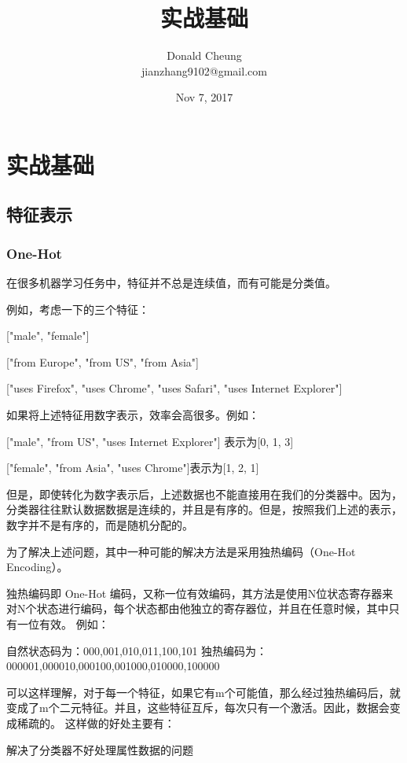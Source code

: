 \documentclass[10pt,a4paper]{ctexbook}
\begin{document}
    \setlength{\baselineskip}{20pt}
    \title{实战基础}
    \author{Donald Cheung\\jianzhang9102@gmail.com}
    \date{Nov 7, 2017}
    \tableofcontents
\fi

\chapter{实战基础}
\section{特征表示}

\subsection{One-Hot}
在很多机器学习任务中，特征并不总是连续值，而有可能是分类值。

例如，考虑一下的三个特征：

["male", "female"]

["from Europe", "from US", "from Asia"]

["uses Firefox", "uses Chrome", "uses Safari", "uses Internet Explorer"]

如果将上述特征用数字表示，效率会高很多。例如：

["male", "from US", "uses Internet Explorer"] 表示为[0, 1, 3]

["female", "from Asia", "uses Chrome"]表示为[1, 2, 1]

但是，即使转化为数字表示后，上述数据也不能直接用在我们的分类器中。因为，分类器往往默认数据数据是连续的，并且是有序的。但是，按照我们上述的表示，数字并不是有序的，而是随机分配的。

为了解决上述问题，其中一种可能的解决方法是采用独热编码（One-Hot Encoding）。

独热编码即 One-Hot 编码，又称一位有效编码，其方法是使用N位状态寄存器来对N个状态进行编码，每个状态都由他独立的寄存器位，并且在任意时候，其中只有一位有效。
例如：

自然状态码为：000,001,010,011,100,101
独热编码为：000001,000010,000100,001000,010000,100000

可以这样理解，对于每一个特征，如果它有m个可能值，那么经过独热编码后，就变成了m个二元特征。并且，这些特征互斥，每次只有一个激活。因此，数据会变成稀疏的。
这样做的好处主要有：

解决了分类器不好处理属性数据的问题
\end{document}

